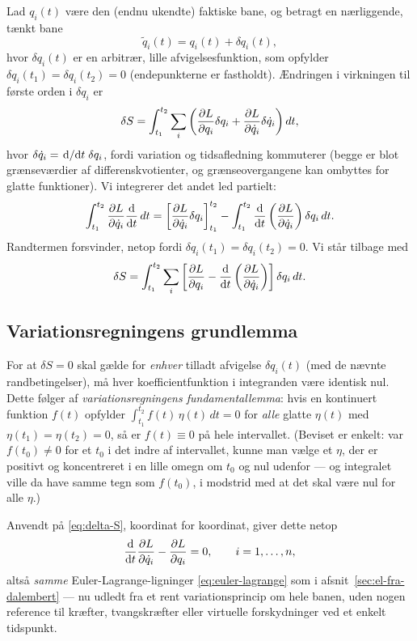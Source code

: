 Lad $q_i(t)$ være den (endnu ukendte) faktiske bane, og betragt en
nærliggende, tænkt bane
\begin{equation}
  \tilde q_i(t) = q_i(t) + \delta q_i(t),
\end{equation}
hvor $\delta q_i(t)$ er en arbitrær, lille afvigelsesfunktion, som
opfylder $\delta q_i(t_1)=\delta q_i(t_2)=0$ (endepunkterne er
fastholdt). Ændringen i virkningen til første orden i $\delta q_i$ er
\begin{equation}
  \delta S = \int_{t_1}^{t_2}\sum_i\left(\pdv{L}{q_i}\delta q_i + \pdv{L}{\dot q_i}\delta\dot q_i\right)dt,
\end{equation}
hvor $\delta\dot q_i = \dv*{}{t}\delta q_i$, fordi variation og
tidsafledning kommuterer (begge er blot grænseværdier af
differenskvotienter, og grænseovergangene kan ombyttes for glatte
funktioner). Vi integrerer det andet led partielt:
\begin{equation}
  \int_{t_1}^{t_2}\pdv{L}{\dot q_i}\dv{}{t}(\delta q_i)\,dt
  = \left[\pdv{L}{\dot q_i}\delta q_i\right]_{t_1}^{t_2}
    - \int_{t_1}^{t_2}\dv{}{t}\left(\pdv{L}{\dot q_i}\right)\delta q_i\,dt.
\end{equation}
Randtermen forsvinder, netop fordi $\delta q_i(t_1)=\delta q_i(t_2)=0$.
Vi står tilbage med
\begin{equation}
  \delta S = \int_{t_1}^{t_2}\sum_i\left[\pdv{L}{q_i} - \dv{}{t}\left(\pdv{L}{\dot q_i}\right)\right]\delta q_i\,dt.
  \label{eq:delta-S}
\end{equation}

\subsection{Variationsregningens grundlemma}

For at $\delta S=0$ skal gælde for \emph{enhver} tilladt afvigelse
$\delta q_i(t)$ (med de nævnte randbetingelser), må hver
koefficientfunktion i integranden være identisk nul. Dette følger af
\emph{variationsregningens fundamentallemma}: hvis en kontinuert
funktion $f(t)$ opfylder $\int_{t_1}^{t_2}f(t)\,\eta(t)\,dt=0$ for
\emph{alle} glatte $\eta(t)$ med $\eta(t_1)=\eta(t_2)=0$, så er
$f(t)\equiv 0$ på hele intervallet. (Beviset er enkelt: var $f(t_0)\neq0$
for et $t_0$ i det indre af intervallet, kunne man vælge et $\eta$, der
er positivt og koncentreret i en lille omegn om $t_0$ og nul udenfor —
og integralet ville da have samme tegn som $f(t_0)$, i modstrid med at
det skal være nul for alle $\eta$.)

Anvendt på \eqref{eq:delta-S}, koordinat for koordinat, giver dette
netop
\begin{equation}
  \dv{t}\pdv{L}{\dot q_i} - \pdv{L}{q_i} = 0, \qquad i=1,\dots,n,
\end{equation}
altså \emph{samme} Euler-Lagrange-ligninger \eqref{eq:euler-lagrange}
som i afsnit~\ref{sec:el-fra-dalembert} — nu udledt fra et rent
variationsprincip om hele banen, uden nogen reference til kræfter,
tvangskræfter eller virtuelle forskydninger ved et enkelt tidspunkt.

